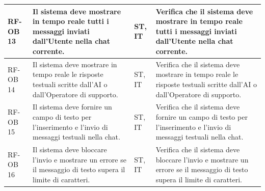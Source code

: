 \documentclass[a4paper,11pt,oneside]{scrartcl}
\begin{document}
\begin{longtable}{|p{1.5cm}|p{4.5cm}|p{1.8cm}|p{6cm}|}
    RF-OB 13         & Il sistema deve mostrare in tempo reale tutti i messaggi inviati dall'Utente nella chat corrente.                                                                                                                                                                                                     & ST, IT             & Verifica che il sistema deve mostrare in tempo reale tutti i messaggi inviati dall'Utente nella chat corrente.                                                                                                                                                                                                     \\ \hline
    RF-OB 14         & Il sistema deve mostrare in tempo reale le risposte testuali scritte dall'AI o dall'Operatore di supporto.                                                                                                                                                                                            & ST, IT             & Verifica che il sistema deve mostrare in tempo reale le risposte testuali scritte dall'AI o dall'Operatore di supporto.                                                                                                                                                                                            \\ \hline
    RF-OB 15         & Il sistema deve fornire un campo di testo per l'inserimento e l'invio di messaggi testuali nella chat.                                                                                                                                                                                                & ST, IT             & Verifica che il sistema deve fornire un campo di testo per l'inserimento e l'invio di messaggi testuali nella chat.                                                                                                                                                                                                \\ \hline
    RF-OB 16         & Il sistema deve bloccare l'invio e mostrare un errore se il messaggio di testo supera il limite di caratteri.                                                                                                                                                                                         & ST, IT             & Verifica che il sistema deve bloccare l'invio e mostrare un errore se il messaggio di testo supera il limite di caratteri.                                                                                                                                                                                         \\ \hline

\end{longtable}
\end{document}

